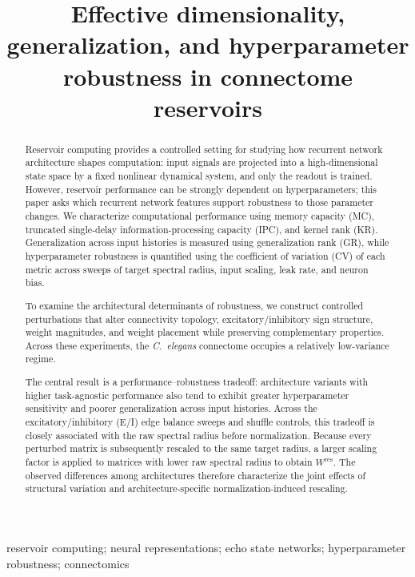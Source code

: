 \documentclass[mlabstract,onecolumn]{jmlr}
\title[Hyperparameter Robustness in Reservoirs]{Effective dimensionality, generalization, and hyperparameter robustness in connectome reservoirs}
\begin{document}
\maketitle

\begin{abstract}
Reservoir computing provides a controlled setting for studying how recurrent network architecture shapes computation: input signals are projected into a high-dimensional state space by a fixed nonlinear dynamical system, and only the readout is trained. However, reservoir performance can be strongly dependent on hyperparameters; this paper asks which recurrent network features support robustness to those parameter changes. We characterize computational performance using memory capacity (MC), truncated single-delay information-processing capacity (IPC), and kernel rank (KR). Generalization across input histories is measured using generalization rank (GR), while hyperparameter robustness is quantified using the coefficient of variation (CV) of each metric across sweeps of target spectral radius, input scaling, leak rate, and neuron bias.

To examine the architectural determinants of robustness, we construct controlled perturbations that alter connectivity topology, excitatory/inhibitory sign structure, weight magnitudes, and weight placement while preserving complementary properties. Across these experiments, the \textit{C.~elegans} connectome occupies a relatively low-variance regime.

The central result is a performance--robustness tradeoff: architecture variants with higher task-agnostic performance also tend to exhibit greater hyperparameter sensitivity and poorer generalization across input histories. Across the excitatory/inhibitory (E/I) edge balance sweeps and shuffle controls, this tradeoff is closely associated with the raw spectral radius before normalization. Because every perturbed matrix is subsequently rescaled to the same target radius, a larger scaling factor is applied to matrices with lower raw spectral radius to obtain $W^{\mathrm{res}}$. The observed differences among architectures therefore characterize the joint effects of structural variation and architecture-specific normalization-induced rescaling.
\end{abstract}

\begin{keywords}
reservoir computing; neural representations; echo state networks; hyperparameter robustness; connectomics
\end{keywords}
\end{document}
